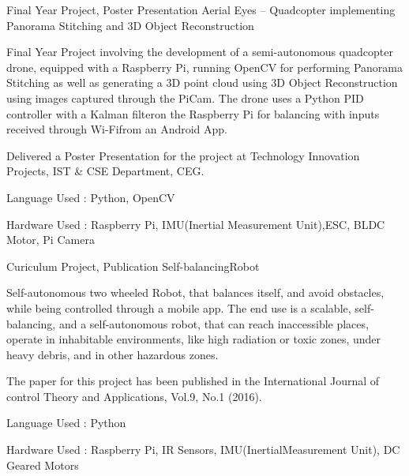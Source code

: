 

\begin{cventries}

  \cventry
    {Final Year Project, Poster Presentation} %
    {Aerial Eyes – Quadcopter implementing Panorama Stitching and 3D Object Reconstruction} %
    {} %
    {} %
    {
      \begin{cvitems}
      \item{Final Year Project involving the development of a semi-autonomous quadcopter drone, equipped with a Raspberry Pi, running OpenCV for performing Panorama Stitching as well as generating a 3D point cloud using 3D Object Reconstruction using images captured through the PiCam. The drone uses a Python PID controller with​ a Kalman​ filter​ on​ the​ Raspberry​ Pi​ for​ balancing​ with​ inputs​ received​ through​ Wi-Fi​ from​ an​ Android​ App. }
      \item{Delivered a Poster Presentation for the project at Technology Innovation Projects, IST \& CSE Department, CEG.}
      \item{Language​ Used​ : Python,​ OpenCV}
      \item{Hardware​ Used​ : Raspberry​ Pi,​ IMU(Inertial​ Measurement​ Unit),​ ESC,​ BLDC​ Motor,​ Pi​ Camera}
      \end{cvitems}
    }

  \cventry
    {Curiculum Project, Publication} %
    {Self-balancing​ Robot} %
    {} %
    {} %
    {
      \begin{cvitems}
      \item{Self-autonomous two wheeled Robot, that balances itself, and avoid obstacles, while being controlled through a mobile app. The end use is a scalable, self-balancing, and a self-autonomous robot, that can reach inaccessible places, operate in inhabitable environments, like high radiation or toxic zones, under heavy debris, and in other hazardous​ zones.}
      \item{The paper for this project has been published in the International Journal of control Theory and Applications, Vol.9, No.1 (2016).}
      \item{Language​ Used​ : Python}
      \item{Hardware​ Used​ : Raspberry​ Pi,​ IR​ Sensors,​ IMU(Inertial​ Measurement​ Unit),​ DC​ Geared​ Motors}
      \end{cvitems}
    }


\end{cventries}

